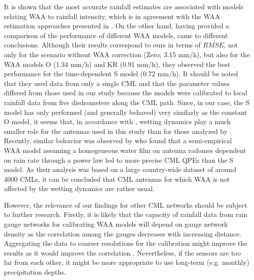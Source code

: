 \documentclass{ctuthesis}\usepackage[]{graphicx}\usepackage[]{color}
\begin{document}
It is shown that the most accurate rainfall estimates are associated with models relating WAA to rainfall intensity, which is in agreement with the WAA estimation approaches presented in \cite{valtrExcessAttenuationCaused2019, kharadlyEffectWetAntenna2001, leijnseMicrowaveLinkRainfall2008, fenclQuantifyingWetAntenna2019}. On the other hand, having provided a comparison of the performance of different WAA models, \cite{schleissQuantificationModelingWetAntenna2013} came to different conclusions. Although their results correspond to ours in terms of $R\!M\!S\!E$, not only for the scenario without WAA correction (Zero; 3.15 mm/h), but also for the WAA models O (1.34 mm/h) and KR (0.91 mm/h), they observed the best performance for the time-dependent S model (0.72 mm/h). It should be noted that they used data from only a single CML and that the parameter values differed from those used in our study because the models were calibrated to local rainfall data from five disdrometers along the CML path. Since, in our case, the S model has only performed (and generally behaved) very similarly as the constant O model, it seems that, in accordance with \cite{lethMeasurementCampaignAssess2018}, wetting dynamics play a much smaller role for the antennas used in this study than for those analyzed by \cite{schleissQuantificationModelingWetAntenna2013}. Recently, similar behavior was observed by \cite{grafRainfallEstimationGermanwide2020} who found that a semi-empirical WAA model assuming a homogeneous water film on antenna radomes dependent on rain rate through a power law \citep{leijnseMicrowaveLinkRainfall2008} led to more precise CML QPEs than the S model. As their analysis was based on a large country-wide dataset of around 4000 CMLs, it can be concluded that CML antennas for which WAA is not affected by the wetting dynamics are rather usual.

However, the relevance of our findings for other CML networks should be subject to further research. Firstly, it is likely that the capacity of rainfall data from rain gauge networks for calibrating WAA models will depend on gauge network density as the correlation among the gauges decreases with increasing distance. Aggregating the data to coarser resolutions for the calibration might improve the results as it would improve the correlation \citep{villariniRainfallSamplingUncertainties2008}. Nevertheless, if the sensors are too far from each other, it might be more appropriate to use long-term (e.g. monthly) precipitation depths. 
\end{document}
